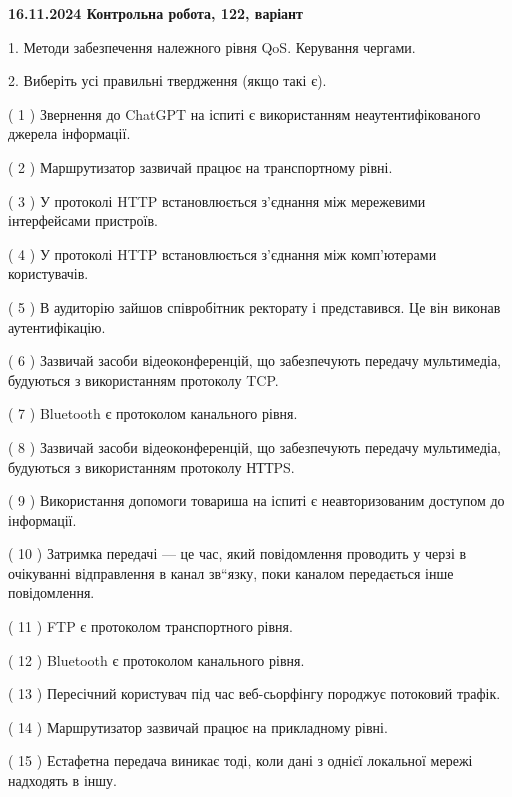 \documentclass[12pt, ukrainian]{article}
\begin{document}
\vspace{4mm}
\newpage
\begin {large}

\textbf{16.11.2024 Контрольна робота, 122, варіант  }\par


{
1. Методи забезпечення належного рівня QoS. Керування чергами.



\vspace{5mm}
2. Виберіть усі правильні твердження (якщо такі є).\par
\vspace{2mm}

( 1 ) Звернення до ChatGPT на іспиті є використанням неаутентифікованого джерела інформації.

( 2 ) Маршрутизатор зазвичай працює на транспортному рівні.

( 3 ) У протоколі HTTP встановлюється з'єднання між мережевими інтерфейсами пристроїв.

( 4 ) У протоколі HTTP встановлюється з'єднання між комп'ютерами користувачів.

( 5 ) В аудиторію зайшов співробітник ректорату і представився. Це він виконав аутентифікацію.

( 6 ) Зазвичай засоби відеоконференцій, що забезпечують передачу мультимедіа, будуються з використанням протоколу TCP.

( 7 ) Bluetooth є протоколом канального рівня.

( 8 ) Зазвичай засоби відеоконференцій, що забезпечують передачу мультимедіа, будуються з використанням протоколу НТТPS.

( 9 ) Використання допомоги товариша на іспиті є неавторизованим доступом до інформації.

( 10 ) Затримка передачі — це час, який повідомлення проводить у черзі в очікуванні відправлення в канал зв“язку, поки каналом передається інше повідомлення.

( 11 ) FTP є протоколом транспортного рівня.

( 12 ) Bluetooth є протоколом канального рівня.

( 13 ) Пересічний користувач під час веб-сьорфінгу породжує потоковий трафік.

( 14 ) Маршрутизатор зазвичай працює на прикладному рівні.

( 15 ) Естафетна передача виникає тоді, коли дані з однієї локальної мережі надходять в іншу.
}
\end {large}
\end{document}
